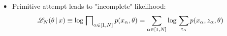 \begin{frame} [t]
\begin{itemize}
{\begin{align*}
                {x } { z \theta}
          \equiv 
            \product _{\alpha} 
            \product _{I}
            \mathcal {N} 
            ( x _{\alpha}, 
              (\mu \sigma) _{\alpha I}
            ) 
            ^{ (z _{\alpha}) ^{I}
             }
          :=
            \product _{\alpha} 
            \product _{I}
            g _{\alpha I}
              ^{ (z _{\alpha}) ^{I}
             }
        \end{align*}    
        }
    \item Primitive attempt  
        leads to "incomplete" likelihood:
        { \footnotesize 
        \begin{align*}
          \mathscr {L} _{N} 
          ( \theta \,\vert\, x )
         \equiv 
          \textnormal{log}\, \operatorname{\bigsqcap} 
                _{\alpha \in [1, N]}
                p (x _{\alpha}, \theta)
         = 
          \sum _{\alpha \in [1, N]}
          \textnormal{log}\, \sum _{z _{\alpha}} 
            p (x _{\alpha}, z _{\alpha},
               \theta)
        \end{align*}    
        }
\end{itemize}   
\end{frame} 


